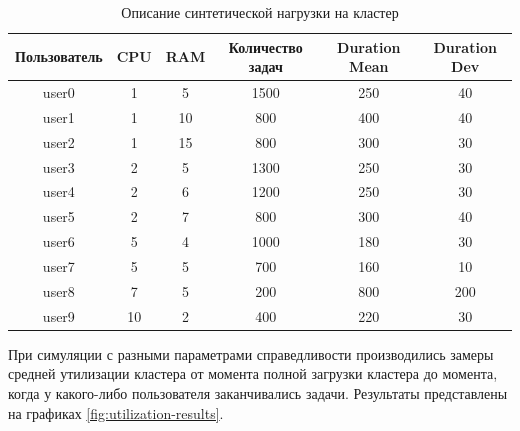 \begin{table}[h!]
    \centering
    \begin{tabular}{|c|c|c|c|c|c|}
        \hline
        \textbf{Пользователь} & \textbf{CPU} & \textbf{RAM} & \textbf{Количество задач} & \textbf{Duration Mean} & \textbf{Duration Dev} \\
        \hline
        user0 & 1 & 5 & 1500 & 250 & 40 \\
        \hline
        user1 & 1 & 10 & 800 & 400 & 40 \\
        \hline
        user2 & 1 & 15 & 800 & 300 & 30 \\
        \hline
        user3 & 2 & 5 & 1300 & 250 & 30 \\
        \hline
        user4 & 2 & 6 & 1200 & 250 & 30 \\
        \hline
        user5 & 2 & 7 & 800 & 300 & 40 \\
        \hline
        user6 & 5 & 4 & 1000 & 180 & 30 \\
        \hline
        user7 & 5 & 5 & 700 & 160 & 10 \\
        \hline
        user8 & 7 & 5 & 200 & 800 & 200 \\
        \hline
        user9 & 10 & 2 & 400 & 220 & 30 \\
        \hline
    \end{tabular}
    \caption{Описание синтетической нагрузки на кластер}
    \label{tab:tasks_load_description}
\end{table}


При симуляции с разными параметрами справедливости производились замеры средней утилизации кластера от момента полной загрузки кластера до момента, когда у какого-либо пользователя заканчивались задачи. Результаты представлены на графиках \ref{fig:utilization-results}.

